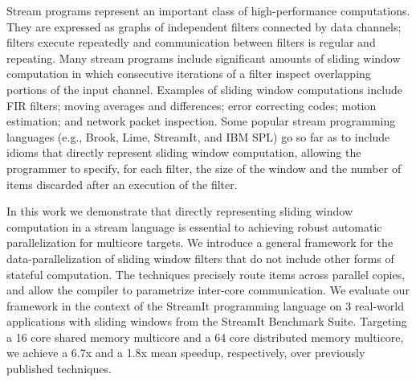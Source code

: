 Stream programs represent an important class of high-performance
computations. They are expressed as graphs of independent filters
connected by data channels; filters execute repeatedly and
communication between filters is regular and repeating.  Many stream
programs include significant amounts of sliding window computation in
which consecutive iterations of a filter inspect overlapping portions
of the input channel.  Examples of sliding window computations include
FIR filters; moving averages and differences; error correcting
codes; motion estimation; and network packet inspection.  Some popular
stream programming languages (e.g., Brook, Lime, StreamIt, and IBM
SPL) go so far as to include idioms that directly represent sliding
window computation, allowing the programmer to specify, for each
filter, the size of the window and the number of items discarded after
an execution of the filter.

In this work we demonstrate that directly representing sliding window
computation in a stream language is essential to achieving robust
automatic parallelization for multicore targets. We introduce a
general framework for the data-parallelization of sliding window
filters that do not include other forms of stateful computation.  The
techniques precisely route items across parallel copies, and allow the
compiler to parametrize inter-core communication.  We evaluate our
framework in the context of the StreamIt programming language on 3
real-world applications with sliding windows from the StreamIt
Benchmark Suite.  Targeting a 16 core shared memory multicore and a 64
core distributed memory multicore, we achieve a 6.7x and a 1.8x mean
speedup, respectively, over previously published techniques.
